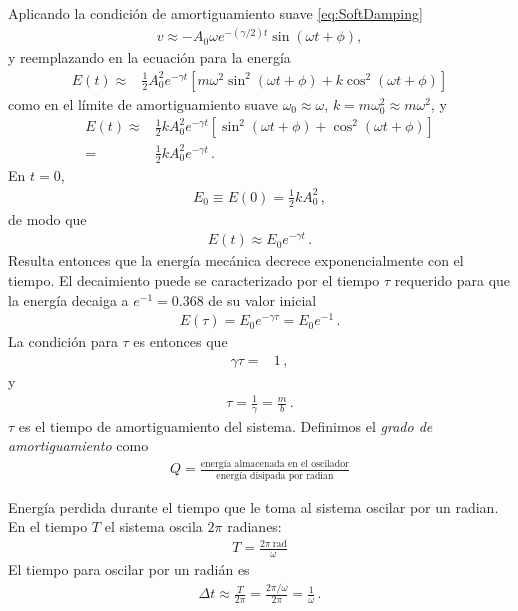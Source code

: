 Aplicando la condición de amortiguamiento suave \eqref{eq:SoftDamping}
\begin{align*}
v\approx  -A_0 \omega e^{-(\gamma/2)t} \sin(\omega t+\phi),
\end{align*}
y reemplazando en la ecuación para la energía 
\begin{align*}
  E(t)\approx&\tfrac{1}{2}A_0^2 e^{-\gamma t} \left[
m\omega^2 \sin^2(\omega t+\phi)+k\cos^2(\omega t+\phi)\right]
\end{align*}
como en el límite de amortiguamiento suave $\omega_0\approx \omega$, $k=m\omega_0^2\approx m\omega^2$, y
\begin{align*}
  E(t)\approx&\tfrac{1}{2}k A_0^2 e^{-\gamma t} \left[
 \sin^2(\omega t+\phi)+\cos^2(\omega t+\phi)\right]\nonumber\\
=&\tfrac{1}{2}k A_0^2 e^{-\gamma t}\,.
\end{align*}
En $t=0$,
\begin{align*}
 E_0\equiv E(0)=\tfrac{1}{2}k A_0^2 \,,
\end{align*}
de modo que
\begin{align*}
  E(t)\approx E_0 e^{-\gamma t}\,.
\end{align*}
Resulta entonces que la energía mecánica decrece exponencialmente con el tiempo.  El decaimiento puede se caracterizado por el tiempo $\tau$ requerido para que la energía decaiga a $e^{-1}=0.368$ de su valor inicial %
\begin{align*}
  E(\tau)=E_0 e^{-\gamma \tau}=E_0 e^{-1}\,.
\end{align*}
La condición para $\tau$ es entonces que
\begin{align*}
  \gamma \tau=&1\,,
\end{align*}
y
\begin{align}
  \label{eq:vidamedia}
  \tau=\frac{1}{\gamma}=\frac{m}{b}\,.
\end{align}
$\tau$ es el tiempo de amortiguamiento del sistema. Definimos el \emph{grado de amortiguamiento} como
\begin{align*}
  Q=\frac{\text{energía almacenada en el oscilador}}{\text{energía disipada por radian}}
\end{align*}

Energía perdida durante el tiempo que le toma al sistema oscilar por un radian.  En el tiempo $T$ el sistema oscila $2\pi$ radianes:
\begin{align*}
  T=\frac{2\pi\ \text{rad}}{\omega}
\end{align*}
El tiempo para oscilar por un radián es
\begin{align*}
  \Delta t\approx \frac{T}{2\pi}=\frac{2\pi/\omega}{2\pi}=\frac{1}{\omega}\,.
\end{align*}

